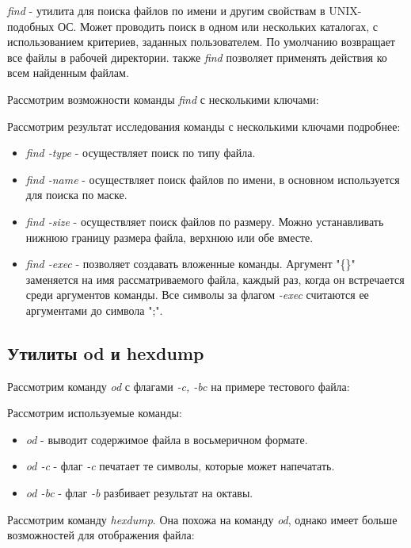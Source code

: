 \documentclass[14pt,a4paper,report]{report}
\begin{document}
\emph{find} - утилита для поиска файлов по имени и другим свойствам в UNIX-подобных ОС. Может проводить поиск в одном или нескольких каталогах, с использованием критериев, заданных пользователем. По умолчанию возвращает все файлы в рабочей директории. также \emph{find} позволяет применять действия ко всем найденным файлам.

Рассмотрим возможности команды \emph{find} с несколькими ключами:



Рассмотрим результат исследования команды с несколькими ключами подробнее:

\begin{itemize}
	\item \emph{find -type} - осуществляет поиск по типу файла.
	\item \emph{find -name} - осуществляет поиск файлов по имени, в основном используется для поиска по маске.
	\item \emph{find -size} - осуществляет поиск файлов по размеру. Можно устанавливать нижнюю границу размера файла, верхнюю или обе вместе.
	\item \emph{find -exec} - позволяет создавать вложенные команды. Аргумент "\{\}" заменяется на имя рассматриваемого файла, каждый раз, когда он встречается среди аргументов команды. Все символы за флагом \emph{-exec} считаются ее аргументами до символа ";".
\end{itemize}

\subsection{Утилиты od и hexdump}

Рассмотрим команду \emph{od} с флагами \emph{-c, -bc} на примере тестового файла:



Рассмотрим используемые команды:

\begin{itemize}
	\item \emph{od} - выводит содержимое файла в восьмеричном формате.
	\item \emph{od -c} - флаг \emph{-c} печатает те символы, которые может напечатать.
	\item \emph{od -bc} - флаг \emph{-b} разбивает результат на октавы.
\end{itemize}

Рассмотрим команду \emph{hexdump}. Она похожа на команду \emph{od}, однако имеет больше возможностей для отображения файла:
\end{document}
